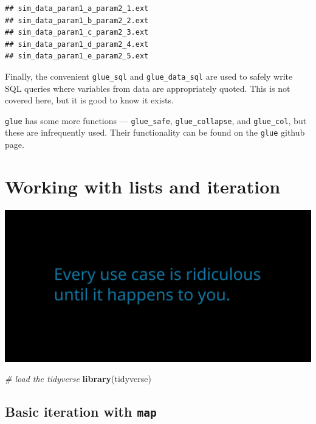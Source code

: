 \documentclass[]{book}
\newenvironment{Shaded}{}{}
\newcommand{\CommentTok}[1]{\textcolor[rgb]{0.38,0.63,0.69}{\textit{#1}}}
\newcommand{\KeywordTok}[1]{\textcolor[rgb]{0.00,0.44,0.13}{\textbf{#1}}}
\newcommand{\NormalTok}[1]{#1}
\begin{document}
\begin{verbatim}
## sim_data_param1_a_param2_1.ext
## sim_data_param1_b_param2_2.ext
## sim_data_param1_c_param2_3.ext
## sim_data_param1_d_param2_4.ext
## sim_data_param1_e_param2_5.ext
\end{verbatim}

Finally, the convenient \texttt{glue\_sql} and \texttt{glue\_data\_sql} are used to safely write SQL queries where variables from data are appropriately quoted. This is not covered here, but it is good to know it exists.

\texttt{glue} has some more functions --- \texttt{glue\_safe}, \texttt{glue\_collapse}, and \texttt{glue\_col}, but these are infrequently used. Their functionality can be found on the \texttt{glue} github page.

\hypertarget{working-with-lists-and-iteration}{%
\chapter{Working with lists and iteration}\label{working-with-lists-and-iteration}}

\includegraphics{opening-image.png}

\begin{Shaded}
\begin{Highlighting}[]
\CommentTok{# load the tidyverse}
\KeywordTok{library}\NormalTok{(tidyverse)}
\end{Highlighting}
\end{Shaded}

\hypertarget{basic-iteration-with-map}{%
\section{\texorpdfstring{Basic iteration with \texttt{map}}{Basic iteration with map}}\label{basic-iteration-with-map}}
\end{document}
